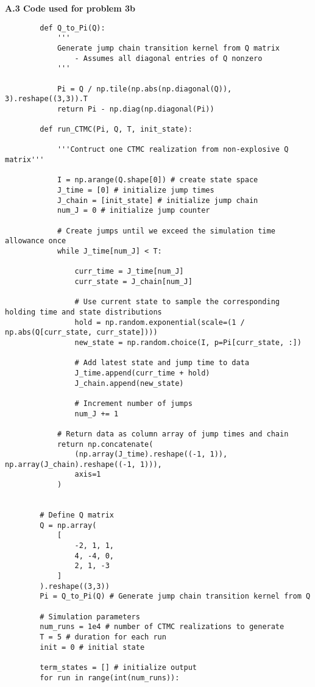 \documentclass[11pt, letterpaper]{article}
\begin{document}
    {\bf A.3 Code used for problem 3b}
    \begin{verbatim}
        def Q_to_Pi(Q):
            '''
            Generate jump chain transition kernel from Q matrix
                - Assumes all diagonal entries of Q nonzero
            '''

            Pi = Q / np.tile(np.abs(np.diagonal(Q)), 3).reshape((3,3)).T
            return Pi - np.diag(np.diagonal(Pi))

        def run_CTMC(Pi, Q, T, init_state):

            '''Contruct one CTMC realization from non-explosive Q matrix'''

            I = np.arange(Q.shape[0]) # create state space
            J_time = [0] # initialize jump times
            J_chain = [init_state] # initialize jump chain
            num_J = 0 # initialize jump counter

            # Create jumps until we exceed the simulation time allowance once
            while J_time[num_J] < T: 

                curr_time = J_time[num_J] 
                curr_state = J_chain[num_J]

                # Use current state to sample the corresponding holding time and state distributions
                hold = np.random.exponential(scale=(1 / np.abs(Q[curr_state, curr_state])))
                new_state = np.random.choice(I, p=Pi[curr_state, :])

                # Add latest state and jump time to data
                J_time.append(curr_time + hold)
                J_chain.append(new_state)

                # Increment number of jumps
                num_J += 1

            # Return data as column array of jump times and chain
            return np.concatenate(
                (np.array(J_time).reshape((-1, 1)), np.array(J_chain).reshape((-1, 1))),
                axis=1
            )


        # Define Q matrix
        Q = np.array(
            [
                -2, 1, 1,
                4, -4, 0,
                2, 1, -3
            ]
        ).reshape((3,3))
        Pi = Q_to_Pi(Q) # Generate jump chain transition kernel from Q

        # Simulation parameters
        num_runs = 1e4 # number of CTMC realizations to generate
        T = 5 # duration for each run
        init = 0 # initial state

        term_states = [] # initialize output 
        for run in range(int(num_runs)):


\end{verbatim}
\end{document}
